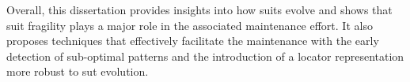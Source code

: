 Overall, this dissertation provides insights into how \gls{suit}s evolve and shows that \gls{suit} fragility plays a major role in the associated maintenance effort. It also proposes techniques that effectively facilitate the maintenance with the early detection of sub-optimal patterns and the introduction of a locator representation more robust to \gls{sut} evolution.

